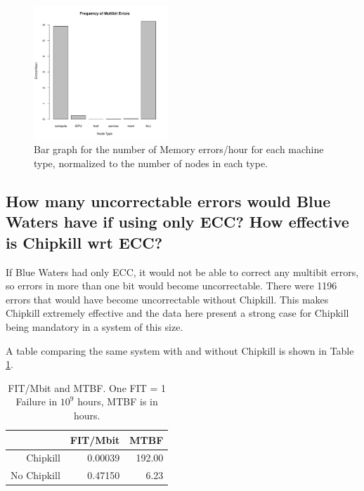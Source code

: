 \begin{figure}[h]
  \centering
  \includegraphics[width=0.45\textwidth]{images/task2_2}
  \caption{Bar graph for the number of Memory errors/hour for each machine
  type, normalized to the number of nodes in each
  type.}\label{fig:mem_error_per_hr_normed}
\end{figure}

\subsection{How many uncorrectable errors would Blue Waters have if using only ECC? How effective is Chipkill wrt ECC?}

If Blue Waters had only ECC, it would not be able to correct any multibit
errors, so errors in more than one bit would become uncorrectable.  There were
1196 errors that would have become uncorrectable without Chipkill.  This makes
Chipkill extremely effective and the data here present a strong case for
Chipkill being mandatory in a system of this size.

A table comparing the same system with and without Chipkill is shown in Table
\ref{tab:mem_fit_mtbf}.
\begin{table}[ht]
\centering
  \begin{tabular}{rrr}
  \hline
  & FIT/Mbit & MTBF \\ 
  \hline
  Chipkill & 0.00039 & 192.00 \\ 
  No Chipkill & 0.47150 & 6.23 \\ 
  \hline
\end{tabular}
\caption{FIT/Mbit and MTBF. One FIT = 1 Failure in $10^9$ hours, MTBF is in
hours.}
\label{tab:mem_fit_mtbf}
\end{table}

